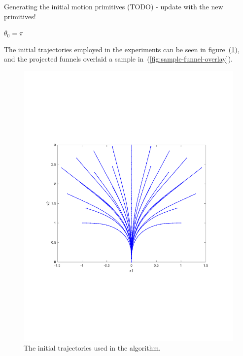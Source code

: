 \begin{algorithm}[H]
  \label{alg:initial-motion-primitives-generation}
  \caption{Generating the initial motion primitives (TODO) - update with the new
    primitives!}
  \DontPrintSemicolon \SetAlgoNoLine

   

  \(\theta_{0} = \pi\) \;

  \;
\end{algorithm}

The initial trajectories employed in the experiments can be seen in
figure~(\ref{fig:intial-trajectories-exp}), and the projected funnels overlaid a
sample in~(\ref{fig:sample-funnel-overlay}).

\begin{figure}
  \centering
  \includegraphics[scale=.5]{figures/experiments/initial-trajectories}
  \caption{The initial trajectories used in the \rrtfunnel{} algorithm.}
  \label{fig:intial-trajectories-exp}
\end{figure}

